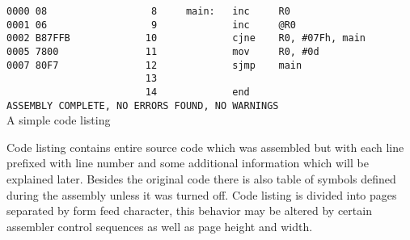 {\begin{code}[h]
                        {\color{highlight_lst_address}\verb'0000'}{\color{highlight_lst_code}\verb' 08'}{\color{highlight_lst_line}\verb'                  8'}\verb'     '{\color{highlight_label}\verb'main:'}\verb'   '{\color{highlight_instruction}\verb'inc'}\verb'     '{\color{highlight_sfr}\verb'R0'}\\
                        {\color{highlight_lst_address}\verb'0001'}{\color{highlight_lst_code}\verb' 06'}{\color{highlight_lst_line}\verb'                  9'}\verb'             '{\color{highlight_instruction}\verb'inc'}\verb'     '{\color{highlight_indirect}\verb'@R0'}\\
                        {\color{highlight_lst_address}\verb'0002'}{\color{highlight_lst_code}\verb' B87FFB'}{\color{highlight_lst_line}\verb'             10'}\verb'             '{\color{highlight_instruction}\verb'cjne'}\verb'    '{\color{highlight_sfr}\verb'R0'}{\color{highlight_oper_sep}\verb','}\verb' '{\color{highlight_imm_hex}\verb'#07Fh'}{\color{highlight_oper_sep}\verb','}\verb' '{\color{highlight_constant}\verb'main'}\\
                        {\color{highlight_lst_address}\verb'0005'}{\color{highlight_lst_code}\verb' 7800'}{\color{highlight_lst_line}\verb'               11'}\verb'             '{\color{highlight_instruction}\verb'mov'}\verb'     '{\color{highlight_sfr}\verb'R0'}{\color{highlight_oper_sep}\verb','}\verb' '{\color{highlight_imm_dec}\verb'#0d'}\\
                        {\color{highlight_lst_address}\verb'0007'}{\color{highlight_lst_code}\verb' 80F7'}{\color{highlight_lst_line}\verb'               12'}\verb'             '{\color{highlight_instruction}\verb'sjmp'}\verb'    '{\color{highlight_constant}\verb'main'}\\
                        {\color{highlight_lst_line}\verb'                        13'}\\
                        {\color{highlight_lst_line}\verb'                        14'}\verb'             '{\color{highlight_directive}\verb'end'}\\
                        {\color{highlight_lst_msg}\verb'ASSEMBLY COMPLETE,'}\verb' NO ERRORS FOUND, NO WARNINGS'\\
                        \caption{A simple code listing}
                \end{code}
                Code listing contains entire source code which was assembled but with each line prefixed with line number and some additional information which will be explained later. Besides the original code there is also table of symbols defined during the assembly unless it was turned off. Code listing is divided into pages separated by form feed character, this behavior may be altered by certain assembler control sequences as well as page height and width.

}
